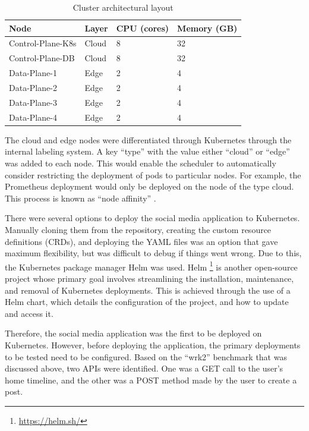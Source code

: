 \begin{table}
    \caption{Cluster architectural layout}\label{tab:cluster-hw-overview}
    \centering
    \begin{tabular}{|l|l|l|l|}
        \hline
        Node & Layer & CPU (cores) & Memory (GB)\\
        \hline
        Control-Plane-K8s & Cloud & 8 & 32\\
        Control-Plane-DB  & Cloud & 8 & 32\\
        Data-Plane-1      & Edge  & 2 & 4\\
        Data-Plane-2      & Edge  & 2 & 4\\
        Data-Plane-3      & Edge  & 2 & 4\\
        Data-Plane-4      & Edge  & 2 & 4\\
        \hline
    \end{tabular}
\end{table}

The cloud and edge nodes were differentiated through Kubernetes through the internal labeling system. A key ``type'' with the value either ``cloud'' or ``edge'' was added to each node. This would enable the scheduler to automatically consider restricting the deployment of pods to particular nodes. For example, the Prometheus deployment would only be deployed on the node of the type cloud. This process is known as ``node affinity'' \cite{santos2019towards}.\par

There were several options to deploy the social media application to Kubernetes. Manually cloning them from the repository, creating the custom resource definitions (CRDs), and deploying the YAML files was an option that gave maximum flexibility, but was difficult to debug if things went wrong. Due to this, the Kubernetes package manager Helm was used. Helm \footnote{\url{https://helm.sh/}} is another open-source project whose primary goal involves streamlining the installation, maintenance, and removal of Kubernetes deployments. This is achieved through the use of a Helm chart, which details the configuration of the project, and how to update and access it.\par

Therefore, the social media application was the first to be deployed on Kubernetes. However, before deploying the application, the primary deployments to be tested need to be configured. Based on the ``wrk2'' benchmark that was discussed above, two APIs were identified. One was a GET call to the user's home timeline, and the other was a POST method made by the user to create a post.\par

